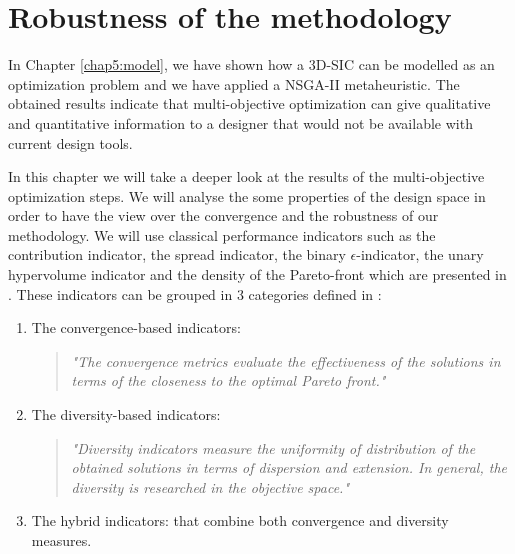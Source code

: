 \chapter{Robustness of the methodology}

\begin{summary}
\lipsum[1]
\end{summary}

In Chapter \ref{chap5:model}, we have shown how a 3D-SIC can be modelled as an optimization problem and we have applied a NSGA-II metaheuristic. The obtained results indicate that multi-objective optimization can give qualitative and quantitative information to a designer that would not be available with current design tools.

In this chapter we will take a deeper look at the results of the multi-objective optimization steps. We will analyse the some properties of the design space in order to have the view over the convergence and the robustness of our methodology. We will use classical performance indicators such as the contribution indicator, the spread indicator, the binary $\epsilon$-indicator, the unary hypervolume indicator and the density of the Pareto-front which are presented in \cite{talbi09, 1197687}. These indicators can be grouped in 3 categories defined in \cite{talbi09}:
\begin{enumerate}
	\item The convergence-based indicators:
	\begin{quote}
		\emph{"The convergence metrics evaluate the effectiveness of the solutions in terms of the closeness to the optimal Pareto front."}
	\end{quote}
	\item The diversity-based indicators:
	\begin{quote}
		\emph{"Diversity indicators measure the uniformity of distribution of the obtained solutions in terms of dispersion and extension. In general, the diversity is researched in the objective space."}
	\end{quote}
	\item The hybrid indicators: that combine both convergence and diversity measures.
\end{enumerate}



